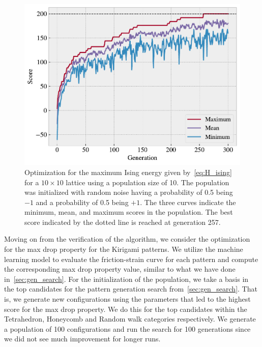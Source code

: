 \begin{figure}[!htb]
  \centering
  \includegraphics[width=0.6\linewidth]{figures/search/ising_max_history.pdf}
  \caption{Optimization for the maximum Ising energy given by~\cref{eq:H_ising} for a $10 \times 10$ lattice using a population size of 10. The population was initialized with random noise having a probability of 0.5 being $-1$ and a probability of 0.5 being $+1$. The three curves indicate the minimum, mean, and maximum scores in the population. The best score indicated by the dotted line is reached at generation 257. }
  \label{fig:ising_max_history}
\end{figure}  

Moving on from the verification of the algorithm, we consider the optimization
for the max drop property for the Kirigami patterns. We utilize the machine
learning model to evaluate the friction-strain curve for each pattern and
compute the corresponding max drop property value, similar to what we have
done in~\cref{sec:gen_search}. For the initialization of the population, we take
a basis in the top candidates for the pattern generation search
from~\cref{sec:gen_search}. That is, we generate new configurations using the
parameters that led to the highest score for the max drop property. We do this
for the top candidates within the Tetrahedron, Honeycomb and Random walk
categories respectively. We generate a population of 100 configurations and run
the search for 100 generations since we did not see much improvement for longer
runs. 

